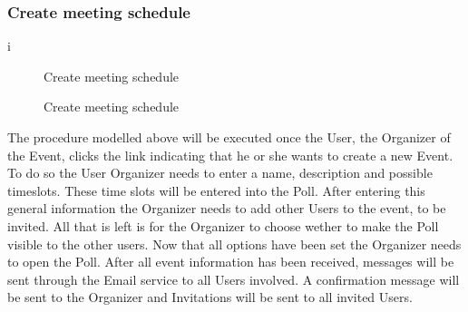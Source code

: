 	\subsubsection{Create meeting schedule}i
		\begin{figure}[H]
			\centering
			\begin{msc}{Create meeting schedule}

				\nextlevel
				\nextlevel
				\nextlevel

				\nextlevel
				\nextlevel
				\nextlevel
				\nextlevel
				\nextlevel
				\nextlevel
				\nextlevel

				\nextlevel
				\nextlevel
				\nextlevel

				\nextlevel
				\nextlevel
				\nextlevel

				\nextlevel
				\nextlevel
				\nextlevel
				\nextlevel
				\nextlevel
				\nextlevel
				\nextlevel
			\end{msc}
			\caption{Create meeting schedule}
			\label{msc:createmeeting}
		\end{figure}

		The procedure modelled above will be executed once the User, the Organizer of the Event, clicks the link indicating that he or she wants to create a new Event. 
		To do so the User Organizer needs to enter a name, description and possible timeslots. These time slots will be entered into the Poll. After entering this general information the Organizer needs to add other Users to the event, to be invited. All that is left is for the Organizer to choose wether to make the Poll visible to the other users. Now that all options have been set the Organizer needs to open the Poll.
		After all event information has been received, messages will be sent through the Email service to all Users involved. A confirmation message will be sent to the 	Organizer and Invitations will be sent to all invited Users.

